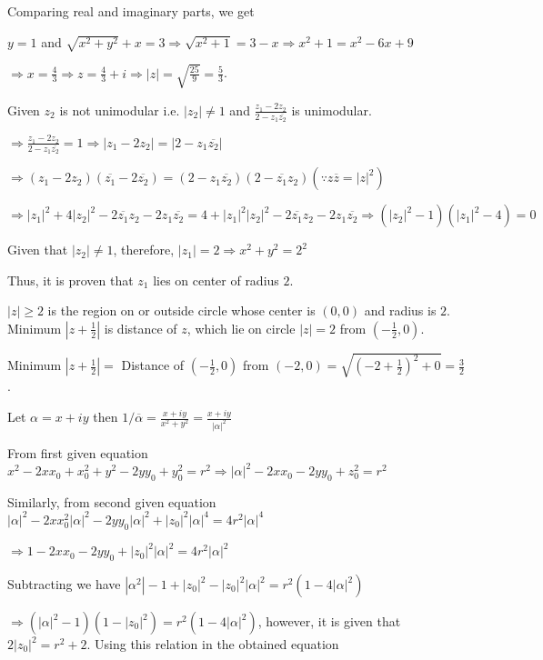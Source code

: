   Comparing real and imaginary parts, we get

  $y = 1$ and $\sqrt{x^2 + y^2} + x = 3 \Rightarrow \sqrt{x^2 + 1} = 3 - x\Rightarrow x^2 + 1 = x^2 - 6x +
  9$

  $\Rightarrow x = \frac{4}{3}\Rightarrow z = \frac{4}{3} + i\Rightarrow |z| = \sqrt{\frac{25}{9}} =
  \frac{5}{3}$.
\item Given $z_2$ is not unimodular i.e. $|z_2|\neq 1$ and $\frac{z_1 - 2z_2}{2 - z_1\overline{z_2}}$ is
  unimodular.

  $\Rightarrow \frac{z_1 - 2z_2}{2 - z_1\overline{z_2}} = 1 \Rightarrow |z_1 - 2z_2| = |2 -
  z_1\overline{z_2}|$

  $\Rightarrow (z_1 - 2z_2)(\overline{z_1} - 2\overline{z_2}) = (2 - z_1\overline{z_2})(2 -
  \overline{z_1}z_2)(\because z\overline{z} = |z|^2)$

  $\Rightarrow |z_1|^2 + 4|z_2|^2 - 2\overline{z_1}z_2 - 2z_1\overline{z_2} = 4 + |z_1|^2|z_2|^2 -
  2\overline{z_1}z_2 - 2z_1\overline{z_2}\Rightarrow (|z_2|^2 - 1)(|z_1|^2 - 4) = 0$

  Given that $|z_2|\neq 1$, therefore, $|z_1| = 2\Rightarrow x^2 + y^2 = 2^2$

  Thus, it is proven that $z_1$ lies on center of radius $2$.
\item $|z|\geq 2$ is the region on or outside circle whose center is $(0, 0)$ and radius is $2$. Minimum
  $\left|z + \frac{1}{2}\right|$ is distance of $z$, which lie on circle $|z| = 2$ from $\left(-\frac{1}{2},
  0\right)$.

  Minimum $\left|z + \frac{1}{2}\right| = $ Distance of $\left(-\frac{1}{2}, 0\right)$ from $(-2, 0) =
  \sqrt{\left(-2 + \frac{1}{2}\right)^2 + 0} = \frac{3}{2}$.
\item Let $\alpha = x + iy$ then $1/\overline{\alpha} = \frac{x + iy}{x^2 + y^2} = \frac{x +
  iy}{|\alpha|^2}$

  From first given equation $x^2 - 2xx_0 + x_0^2 + y^2 - 2yy_0 + y_0^2 = r^2 \Rightarrow |\alpha|^2 - 2xx_0
  - 2yy_0 + z_0^2 = r^2$

  Similarly, from second given equation $|\alpha|^2 - 2xx_0^2|\alpha|^2 - 2yy_0|\alpha|^2 + |z_0|^2|\alpha|^4
  = 4r^2|\alpha|^4$

  $\Rightarrow 1 - 2xx_0 - 2yy_0 + |z_0|^2|\alpha|^2 = 4r^2|\alpha|^2$

  Subtracting we have $|\alpha^2| - 1 + |z_0|^2 - |z_0|^2|\alpha|^2 = r^2(1 - 4|\alpha|^2)$

  $\Rightarrow (|\alpha|^2 - 1)(1 - |z_0|^2) = r^2(1 - 4|\alpha|^2)$, however, it is given that $2|z_0|^2 =
  r^2 + 2$. Using this relation in the obtained equation

